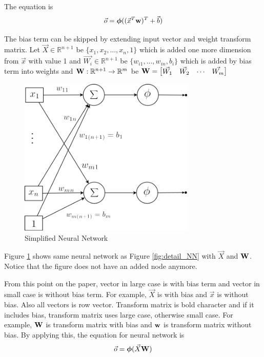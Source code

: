 \documentclass[draft,dvipsnames]{drexel-thesis}
\begin{document}
\begin{thesis}
The equation is
$$\vec{o} = \bm{\phi}((\vec{x}^T\bold{w})^T+\vec{b})$$

The bias term can be skipped by extending input vector and weight transform matrix. Let $\vec{X} \in \mathbb{R}^{n+1}$ be $\{x_1, x_2, ..., x_n, 1\}$ which is added one more dimension from $\vec{x}$ with value 1 and $\vec{W_i} \in \mathbb{R}^{n+1}$ be $\{w_{i1}, ..., w_{in}, b_i\}$ which is added by bias term into weights and $\bold{W}: \mathbb{R}^{n+1} \rightarrow \mathbb{R}^m$ be
$\bold{W}=
\begin{bmatrix}
	\vec{W_1} & \vec{W_2} & \cdots & \vec{W_m}
\end{bmatrix}$

\begin{figure}[t!]
    \centering
    \includegraphics[width=0.75\textwidth]{pictures/figures/detail_NN_with_bias.png}
    \caption{Simplified Neural Network}
    \label{fig:withoutBiasNN}
\end{figure}

Figure \ref{fig:withoutBiasNN} shows same neural network as Figure \ref{fig:detail_NN} with $\vec{X}$ and $\bold{W}$. Notice that the figure does not have an added node anymore.

	From this point on the paper, vector in large case is with bias term and vector in small case is without bias term. For example, $\vec{X}$ is with bias and $\vec{x}$ is without bias. Also all vectors is row vector. Transform matrix is bold character and if it includes bias, transform matrix uses large case, otherwise small case. For example, $\bold{W}$ is transform matrix with bias and $\bold{w}$ is transform matrix without bias. By applying this, the equation for neural network is
$$\vec{o} = \bm{\phi}(\vec{X}\bold{W})$$


\end{thesis}
\end{document}
